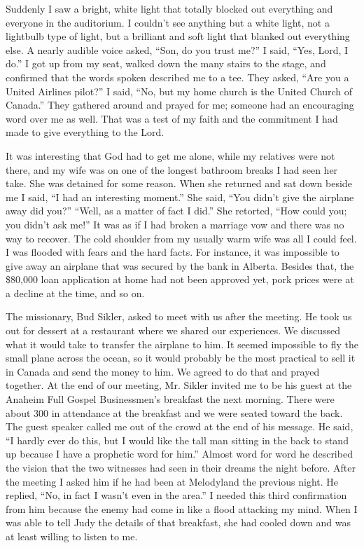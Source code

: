 \documentclass[oneside]{book}
\begin{document}
Suddenly I saw a bright, white light that totally blocked out everything and everyone in the auditorium. I couldn't see anything but a white light, not a lightbulb type of light, but a brilliant and soft light that blanked out everything else. A nearly audible voice asked, “Son, do you trust me?” I said, “Yes, Lord, I do.” I got up from my seat, walked down the many stairs to the stage, and confirmed that the words spoken described me to a tee. They asked, “Are you a United Airlines pilot?” I said, “No, but my home church is the United Church of Canada.” They gathered around and prayed for me; someone had an encouraging word over me as well. That was a test of my faith and the commitment I had made to give everything to the Lord.

It was interesting that God had to get me alone, while my relatives were not there, and my wife was on one of the longest bathroom breaks I had seen her take. She was detained for some reason. When she returned and sat down beside me I said, “I had an interesting moment.” She said, “You didn't give the airplane away did you?” “Well, as a matter of fact I did.” She retorted, “How could you; you didn't ask me!” It was as if I had broken a marriage vow and there was no way to recover. The cold shoulder from my usually warm wife was all I could feel. I was flooded with fears and the hard facts.  For instance, it was impossible to give away an airplane that was secured by the bank in Alberta. Besides that, the \$80,000 loan application at home had not been approved yet,  pork prices were at a decline at the time, and so on.

The missionary, Bud Sikler, asked to meet with us after the meeting. He took us out for dessert at a restaurant where we shared our experiences. We discussed what it would take to transfer the airplane to him. It seemed impossible to fly the small plane across the ocean, so it would probably be the most practical to sell it in Canada and send the money to him. We agreed to do that and prayed together. At the end of our meeting, Mr. Sikler invited me to be his guest at the Anaheim Full Gospel Businessmen's breakfast the next morning. There were about 300 in attendance at the breakfast and we were seated toward the back. The guest speaker called me out of the crowd at the end of his message. He said, “I hardly ever do this, but I would like the tall man sitting in the back to stand up because I have a prophetic word for him.” Almost word for word he described the vision that the two witnesses had seen in their dreams the night before. After the meeting I asked him if he had been at Melodyland the previous night. He replied, “No, in fact I wasn't even in the area.” I needed this third confirmation from him because the enemy had come in like a flood attacking my mind. When I was able to tell Judy the details of that breakfast, she had cooled down and was at least willing to listen to me.
\end{document}
